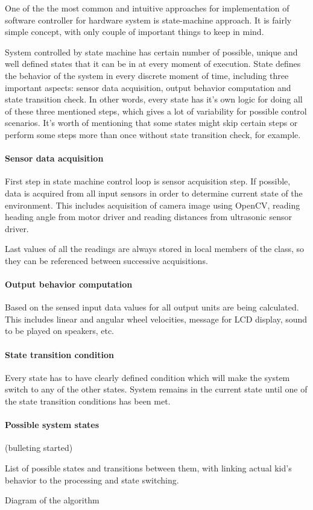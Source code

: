 
One of the the most common and intuitive approaches for implementation of software controller for hardware system is state-machine approach. It is fairly simple concept, with only couple of important things to keep in mind. 

System controlled by state machine has certain number of possible, unique and well defined states that it can be in at every moment of execution. State defines the behavior of the system in every discrete moment of time, including three important aspects: sensor data acquisition, output behavior computation and state transition check. In other words, every state has it\rq{}s own logic for doing all of these three mentioned steps, which gives a lot of variability for possible control scenarios. It\rq{}s worth of mentioning that some states might skip certain steps or perform some steps more than once without state transition check, for example.

\paragraph{Sensor data acquisition}

First step in state machine control loop is sensor acquisition step. If possible, data is acquired from all input sensors in order to determine current state of the environment. This includes acquisition of camera image using OpenCV, reading heading angle from motor driver and reading distances from ultrasonic sensor driver.

Last values of all the readings are always stored in local members of the class, so they can be referenced between successive acquisitions.

\paragraph{Output behavior computation}

Based on the sensed input data values for all output units are being calculated. This includes linear and angular wheel velocities, message for LCD display, sound to be played on speakers, etc.

\paragraph{State transition condition}

Every state has to have clearly defined condition which will make the system switch to any of the other states. System remains in the current state until one of the state transition conditions has been met.

\paragraph{Possible system states}

(bulleting started)

List of possible states and transitions between them, with linking actual kid\rq{}s behavior to the processing and state switching.

Diagram of the algorithm
